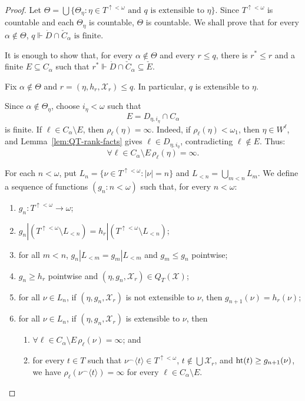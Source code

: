 \begin{proof}
  Let $\Theta=\bigcup\{\Theta_\eta:\eta\in T^{\uparrow<\omega}\text{ and }q\text{ is extensible to }\eta\}$.
  Since $T^{\uparrow<\omega}$ is countable and each $\Theta_\eta$ is countable,
  $\Theta$ is countable.
  We shall prove that for every $\alpha\notin\Theta$, $q\Vdash \dot D\cap \check C_\alpha\text{ is finite}$.

  It is enough to show that, for every $\alpha\notin\Theta$ and every
  $r\leq q$, there is $r^*\leq r$ and a finite $E\subseteq C_\alpha$ such that $r^*\Vdash \dot D\cap \check C_\alpha\subseteq \check E$.

  Fix $\alpha\notin\Theta$ and $r=(\eta,h_r,\mathcal X_r)\leq q$.  In particular,
  $q$ is extensible to $\eta$.

  Since $\alpha\notin\Theta_\eta$, choose $i_\eta<\omega$ such that
  \[
    E=D_{\eta,i_\eta}\cap C_\alpha
  \]
  is finite.  If $\ell\in C_\alpha\setminus E$, then
  $\rho_\ell(\eta)=\infty$.  Indeed, if $\rho_\ell(\eta)<\omega_1$, then
  $\eta\in W^\ell$, and Lemma~\ref{lem:QT-rank-facts} gives
  $\ell\in D_{\eta,i_\eta}$, contradicting $\ell\notin E$.
  Thus:
  \begin{equation}\label{eq:QT-case-two-initial-ranks}\tag{$\star$}
    \forall \ell\in C_\alpha\setminus E\, \rho_\ell(\eta)=\infty.
  \end{equation}

  For each $n<\omega$, put $L_n=\{\nu\in T^{\uparrow<\omega}:|\nu|=n\}$ and $L_{<n}=\bigcup_{m<n}L_m$.
  We define a sequence of functions $(g_n:n<\omega)$ such that, for every $n<\omega$:
  \begin{enumerate}[label=(\arabic*)]
    \item $g_n:T^{\uparrow<\omega}\to\omega$; \item $g_n|(T^{\uparrow<\omega}\setminus L_{<n})=h_r|(T^{\uparrow<\omega}\setminus L_{<n})$;
    \item for all $m<n$, $g_n|L_{<m}=g_m|L_{<m}$ and $g_m\leq g_n$ pointwise;
    \item $g_n\geq h_r$ pointwise and $(\eta, g_n,\mathcal X_r)\in Q_T(\mathcal X)$;
    \item for all $\nu \in L_n$, if $(\eta,g_n,\mathcal X_r)$ is not extensible to $\nu$, then $g_{n+1}(\nu)=h_r(\nu)$;
    \item for all $\nu\in L_n$, if $(\eta,g_n,\mathcal X_r)$ is
      extensible to $\nu$, then
      \begin{enumerate}[label=(\roman*)]
        \item $\forall \ell\in C_\alpha\setminus E\, \rho_\ell(\nu)=\infty$; and
        \item for every $t\in T$ such that $\nu^\frown\langle t\rangle\in T^{\uparrow<\omega}$, $t\notin\bigcup\mathcal X_r$, and $\operatorname{ht}(t)\geq g_{n+1}(\nu)$, we have $\rho_\ell(\nu^\frown\langle t\rangle)=\infty$ for every $\ell\in C_\alpha\setminus E$.
      \end{enumerate}
  \end{enumerate}


\end{proof}
